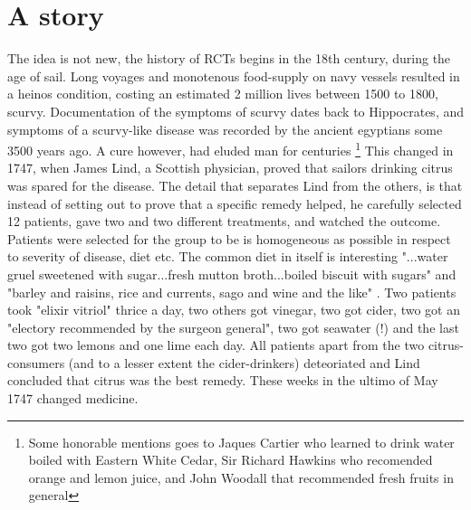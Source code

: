 \documentclass[12p]{article}
\begin{document}
\section*{A story}

The idea is not new, the history of RCTs begins in the 18th century, during the age of sail.
Long voyages and monotenous food-supply on navy vessels resulted in a heinos condition, costing an estimated 2 million lives between 1500 to 1800, scurvy.
Documentation of the symptoms of scurvy dates back to Hippocrates, and symptoms of a scurvy-like disease was recorded by the ancient egyptians some 3500 years ago.
A cure however, had eluded man for centuries \footnote{Some honorable mentions goes to Jaques Cartier who learned to drink water boiled with Eastern White Cedar, Sir Richard Hawkins who recomended orange and lemon juice, and John Woodall that recommended fresh fruits in general}
This changed in 1747, when James Lind, a Scottish physician, proved that sailors drinking citrus was spared for the disease.
The detail that separates Lind from the others, is that instead of setting out to prove that a specific remedy helped, he carefully selected 12 patients, gave two and two different treatments, and watched the outcome.
Patients were selected for the group to be is homogeneous as possible in respect to severity of disease, diet etc.
The common diet in itself is interesting "...water gruel sweetened with sugar...fresh mutton broth...boiled biscuit with sugars" and "barley and raisins, rice and currents, sago and wine and the like" \cite{RN3}.
Two patients took "elixir vitriol" thrice a day, two others got vinegar, two got cider, two got an "electory recommended by the surgeon general", two got seawater (!) and the last two got two lemons and one lime each day.
All patients apart from the two citrus-consumers (and to a lesser extent the cider-drinkers) deteoriated and Lind concluded that citrus was the best remedy.
These weeks in the ultimo of May 1747 changed medicine.


\end{document}

